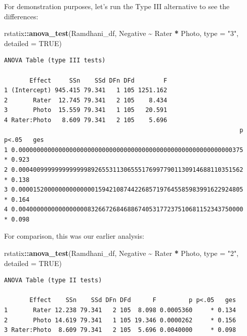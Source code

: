 \documentclass[
  11pt,
]{book}
\newenvironment{Shaded}{\begin{snugshade}}{\end{snugshade}}
\newcommand{\AttributeTok}[1]{\textcolor[rgb]{0.27,0.27,0.27}{#1}}
\newcommand{\ConstantTok}[1]{\textcolor[rgb]{0.37,0.37,0.37}{#1}}
\newcommand{\FunctionTok}[1]{\textcolor[rgb]{0.27,0.27,0.27}{\textbf{#1}}}
\newcommand{\NormalTok}[1]{#1}
\newcommand{\SpecialCharTok}[1]{\textcolor[rgb]{0.43,0.43,0.43}{\textbf{#1}}}
\newcommand{\StringTok}[1]{\textcolor[rgb]{0.5,0.5,0.5}{#1}}
\begin{document}
For demonstration purposes, let's run the Type III alternative to see the differences:

\begin{Shaded}
\begin{Highlighting}[]
\NormalTok{rstatix}\SpecialCharTok{::}\FunctionTok{anova\_test}\NormalTok{(Ramdhani\_df, Negative }\SpecialCharTok{\textasciitilde{}}\NormalTok{ Rater }\SpecialCharTok{*}\NormalTok{ Photo, }\AttributeTok{type =} \StringTok{"3"}\NormalTok{,}
    \AttributeTok{detailed =} \ConstantTok{TRUE}\NormalTok{)}
\end{Highlighting}
\end{Shaded}

\begin{verbatim}
ANOVA Table (type III tests)

       Effect     SSn    SSd DFn DFd        F
1 (Intercept) 945.415 79.341   1 105 1251.162
2       Rater  12.745 79.341   2 105    8.434
3       Photo  15.559 79.341   1 105   20.591
4 Rater:Photo   8.609 79.341   2 105    5.696
                                                                 p p<.05   ges
1 0.00000000000000000000000000000000000000000000000000000000000375     * 0.923
2 0.00040099999999999998926553113065551769977901130914688110351562     * 0.138
3 0.00001520000000000000015942108744226857197645585983991622924805     * 0.164
4 0.00400000000000000008326672684688674053177237510681152343750000     * 0.098
\end{verbatim}

For comparison, this was our earlier analysis:

\begin{Shaded}
\begin{Highlighting}[]
\NormalTok{rstatix}\SpecialCharTok{::}\FunctionTok{anova\_test}\NormalTok{(Ramdhani\_df, Negative }\SpecialCharTok{\textasciitilde{}}\NormalTok{ Rater }\SpecialCharTok{*}\NormalTok{ Photo, }\AttributeTok{type =} \StringTok{"2"}\NormalTok{,}
    \AttributeTok{detailed =} \ConstantTok{TRUE}\NormalTok{)}
\end{Highlighting}
\end{Shaded}

\begin{verbatim}
ANOVA Table (type II tests)

       Effect    SSn    SSd DFn DFd      F         p p<.05   ges
1       Rater 12.238 79.341   2 105  8.098 0.0005360     * 0.134
2       Photo 14.619 79.341   1 105 19.346 0.0000262     * 0.156
3 Rater:Photo  8.609 79.341   2 105  5.696 0.0040000     * 0.098
\end{verbatim}
\end{document}
